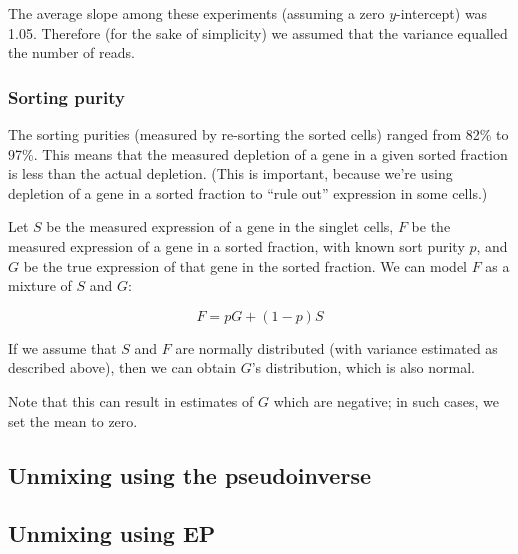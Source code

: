 \documentclass{article}
\begin{document}
The average slope among these experiments (assuming a zero $y$-intercept) was 1.05.
Therefore (for the sake of simplicity)
we assumed that the variance equalled the number of reads.

\subsubsection*{Sorting purity}

The sorting purities (measured by re-sorting the sorted cells) ranged from 82\% to 97\%.
This means that the measured depletion of a gene in a given sorted fraction is less than
the actual depletion. (This is important, because we're using depletion of a gene in a
sorted fraction to ``rule out'' expression in some cells.)

Let $S$ be the measured expression of a gene in the singlet cells,
$F$ be the
measured expression of a gene in a sorted fraction, with known sort purity $p$, and
$G$ be the true expression of that gene in the sorted fraction.
We can model $F$ as a mixture of $S$ and $G$:

\[
F = pG + (1-p)S
\]

If we assume that $S$ and $F$ are normally distributed (with variance estimated as described
above), then we can obtain $G$'s distribution, which is also normal.

Note that this can result in estimates of $G$ which are negative; in such
cases, we set the mean to zero.

\subsection*{Unmixing using the pseudoinverse}





\subsection*{Unmixing using EP}
\end{document}
